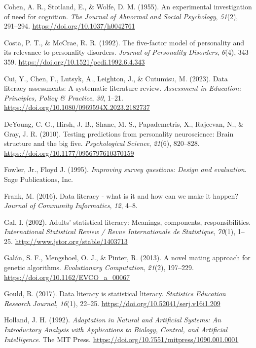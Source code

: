 \documentclass[
  12pt,
  a4paper,
  twoside]{article}
\newlength{\cslhangindent}
\newenvironment{CSLReferences}[2] %
 {\begin{list}{}{%
  \setlength{\itemindent}{0pt}
  \setlength{\leftmargin}{0pt}
  \setlength{\parsep}{0pt}
  \ifodd #1
   \setlength{\leftmargin}{\cslhangindent}
   \setlength{\itemindent}{-1\cslhangindent}
  \fi
  \setlength{\itemsep}{#2\baselineskip}}}
 {\end{list}}
\begin{document}
\begin{CSLReferences}{1}{0}
Cohen, A. R., Stotland, E., \& Wolfe, D. M. (1955). An experimental investigation of need for cognition. \emph{The Journal of Abnormal and Social Psychology}, \emph{51}(2), 291--294. \url{https://doi.org/10.1037/h0042761}

Costa, P. T., \& McCrae, R. R. (1992). The five-factor model of personality and its relevance to personality disorders. \emph{Journal of Personality Disorders}, \emph{6}(4), 343--359. \url{https://doi.org/10.1521/pedi.1992.6.4.343}

Cui, Y., Chen, F., Lutsyk, A., Leighton, J., \& Cutumisu, M. (2023). Data literacy assessments: A systematic literature review. \emph{Assessment in Education: Principles, Policy \& Practice}, \emph{30}, 1--21. \url{https://doi.org/10.1080/0969594X.2023.2182737}

DeYoung, C. G., Hirsh, J. B., Shane, M. S., Papademetris, X., Rajeevan, N., \& Gray, J. R. (2010). Testing predictions from personality neuroscience: Brain structure and the big five. \emph{Psychological Science}, \emph{21}(6), 820--828. \url{https://doi.org/10.1177/0956797610370159}

Fowler, Jr., Floyd J. (1995). \emph{Improving survey questions: Design and evaluation}. Sage Publications, Inc.

Frank, M. (2016). Data literacy - what is it and how can we make it happen? \emph{Journal of Community Informatics}, \emph{12}, 4--8.

Gal, I. (2002). Adults' statistical literacy: Meanings, components, responsibilities. \emph{International Statistical Review / Revue Internationale de Statistique}, \emph{70}(1), 1--25. \url{http://www.jstor.org/stable/1403713}

Galán, S. F., Mengshoel, O. J., \& Pinter, R. (2013). A novel mating approach for genetic algorithms. \emph{Evolutionary Computation}, \emph{21}(2), 197--229. \url{https://doi.org/10.1162/EVCO_a_00067}

Gould, R. (2017). Data literacy is statistical literacy. \emph{Statistics Education Research Journal}, \emph{16}(1), 22--25. \url{https://doi.org/10.52041/serj.v16i1.209}

Holland, J. H. (1992). \emph{{Adaptation in Natural and Artificial Systems: An Introductory Analysis with Applications to Biology, Control, and Artificial Intelligence}}. The MIT Press. \url{https://doi.org/10.7551/mitpress/1090.001.0001}


\end{CSLReferences}
\end{document}
